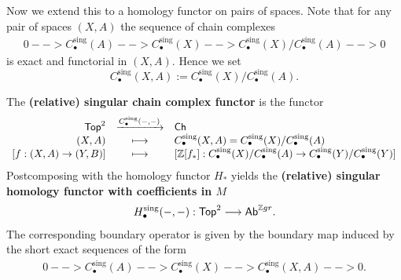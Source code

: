 \begin{definition}
	\end{definition}

	Now we extend this to a homology functor on pairs of spaces. Note that for any pair of spaces $(X,A)$ the sequence of chain complexes
	\begin{align*}
		0 --> C_\bullet^\text{sing}(A) --> C_\bullet^\text{sing}(X) --> C_\bullet^\text{sing}(X)/C_\bullet^\text{sing}(A) --> 0
	\end{align*}
	is exact and functorial in $(X,A)$. Hence we set
	\begin{equation*}
		C_\bullet^\text{sing}(X,A) := C_\bullet^\text{sing}(X)/C_\bullet^\text{sing}(A).
	\end{equation*}

	\begin{definition}
		The \textbf{(relative) singular chain complex functor} is the functor
		\begin{equation*}
			\begin{array}{rcl}
				\textsf{Top}^2 & \xrightarrow{C_\bullet^\text{sing}(-,-)} & \textsf{Ch}\\
				(X,A) & \longmapsto & C_\bullet^\text{sing}(X,A) = C_\bullet^\text{sing}(X)/C_\bullet^\text{sing}(A)\\
				{[f:(X,A)\rightarrow(Y,B)]} & \longmapsto & {[\mathbb{Z}[f_{*}]:C_\bullet^\text{sing}(X)/C_\bullet^\text{sing}(A) \rightarrow C_\bullet^\text{sing}(Y) / C_\bullet^\text{sing}(Y)]}
			\end{array}
		\end{equation*}
		Postcomposing with the homology functor $H_{*}$ yields the \textbf{(relative) singular homology functor with coefficients in $M$}
		\begin{align*}
			H_\bullet^\text{sing}(-,-): \textsf{Top}^2 --> \textsf{Ab}^{\mathbb{Z} gr}.
		\end{align*}
		The corresponding boundary operator is given by the boundary map induced by the short exact sequences of the form
		\begin{align*}
			0 --> C_\bullet^\text{sing}(A) --> C_\bullet^\text{sing}(X) --> C_\bullet^\text{sing}(X,A) --> 0.
		\end{align*}
	\end{definition}

